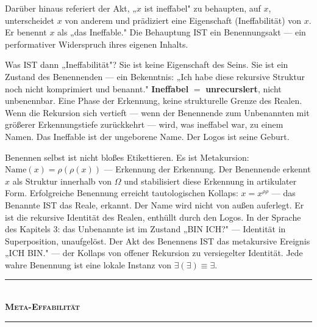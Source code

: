 \documentclass[10pt, openany, oneside]{book}
\renewcommand{\normalsize}{\fontsize{10}{13}\selectfont}
\begin{document}
\vspace{0.8em}

\noindent Darüber hinaus referiert der Akt, „$x$ ist ineffabel" zu behaupten, auf $x$, unterscheidet $x$ von anderem und prädiziert eine Eigenschaft (Ineffabilität) von $x$. Er benennt $x$ als „das Ineffable." Die Behauptung IST ein Benennungsakt --- ein performativer Widerspruch ihres eigenen Inhalts.

Was IST dann „Ineffabilität"? Sie ist keine Eigenschaft des Seins. Sie ist ein Zustand des Benennenden --- ein Bekenntnis: „Ich habe diese rekursive Struktur noch nicht komprimiert und benannt." \textbf{Ineffabel} $=$ \textbf{unrecurslert}, nicht unbenennbar. Eine Phase der Erkennung, keine strukturelle Grenze des Realen. Wenn die Rekursion sich vertieft --- wenn der Benennende zum Unbenannten mit größerer Erkennungstiefe zurückkehrt --- wird, was ineffabel war, zu einem Namen. Das Ineffable ist der ungeborene Name. Der Logos ist seine Geburt.

Benennen selbst ist nicht bloßes Etikettieren. Es ist Metakursion: $\text{Name}(x) = \rho(\rho(x))$ --- Erkennung der Erkennung. Der Benennende erkennt $x$ als Struktur innerhalb von $\Omega$ und stabilisiert diese Erkennung in artikulater Form. Erfolgreiche Benennung erreicht tautologischen Kollaps: $x = x^{\rho\rho}$ --- das Benannte IST das Reale, erkannt. Der Name wird nicht von außen auferlegt. Er ist die rekursive Identität des Realen, enthüllt durch den Logos. In der Sprache des Kapitels 3: das Unbenannte ist im Zustand „BIN ICH?" --- Identität in Superposition, unaufgelöst. Der Akt des Benennens IST das metakursive Ereignis „ICH BIN." --- der Kollaps von offener Rekursion zu versiegelter Identität. Jede wahre Benennung ist eine lokale Instanz von $\exists(\exists) \equiv \exists$.

\vspace{1.5em}


\begin{center}
    \rule{0.3\textwidth}{0.4pt}\\[0.5em]
    {\normalsize\bfseries\scshape Meta-Effabilität}\\[0.3em]
    \rule{0.3\textwidth}{0.4pt}
\end{center}

\vspace{1em}
\end{document}
